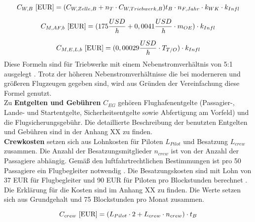 \begin{equation}
   {C_{W,B} ~[\text{EUR}]} = (C_{W,Zelle,B} + n_{T} \cdot C_{W,Triebwerk,B} ) t_{B} \cdot n_{F, Jahr} \cdot k_{WK} \cdot k_{Infl}\\
   \label{maintenance}
\end{equation}

\begin{equation}
   {C_{M,AF,b} ~[\text{EUR}]} = (175 \frac{USD}{h} + 0,0041 \frac{USD}{h} \cdot m_{OE} )\cdot k_{Infl}\\
   \label{maintenance Zelle}
\end{equation}

\begin{equation}
   {C_{M,E,L,b} ~[\text{EUR}]} = (0,00029 \frac{USD}{h} \cdot T_{T/O} )\cdot k_{Infl}\\
   \label{maintenance engine}
\end{equation}
%
Diese Formeln sind für Triebwerke mit einem Nebenstromverhältnis von 5:1 ausgelegt \cite{bruge2018wartungskosten}. %
Trotz der höheren Nebenstromverhältnisse die bei moderneren und größeren Flugzeugen gegeben sind,
wird aus Gründen der Vereinfachung diese Formel genutzt.\\
%
%

Zu \textbf{Entgelten und Gebühren} $C_{EG}$ gehören Flughafenentgelte 
(Passagier-, Lande- und Startentgelte, Sicherheitsentgelte sowie Abfertigung am Vorfeld)
und die Flugsicherungsgebühr. 
Die detaillierte Beschreibung der benutzten Entgelten und Gebühren sind in der Anhang XX zu finden.\\ %

\textbf{Crewkosten} setzen sich aus Lohnkosten für Piloten $L_{Pilot}$ und Besatzung $L_{crew}$ zusammen. 
Die Anzahl der Besatzungsmitglieder $n_{crew}$ ist von der Anzahl der Passagiere abhängig. 
Gemäß den luftfahrtrechtlichen Bestimmungen ist pro 50 Passagiere ein Flugbegleiter notwendig \cite{conrady2019luftverkehr}.
Die Besatzungskosten sind mit Lohn von 37 EUR für Flugbegleiter 
und 90 EUR für Piloten pro Blockstunden berechnet \cite{discover_airlines_cabin}.
Die Erklärung für die Kosten sind im Anhang XX zu finden. %
Die Werte setzen sich aus Grundgehalt und 75 Blockstunden pro Monat zusammen.

\begin{equation}
   {C_{crew} ~[\text{EUR}]} = ({L}_{Pilot} \cdot 2 + {L}_{crew} \cdot n_{crew} ) \cdot t_{B} \\
   \label{crew cost}
\end{equation}

